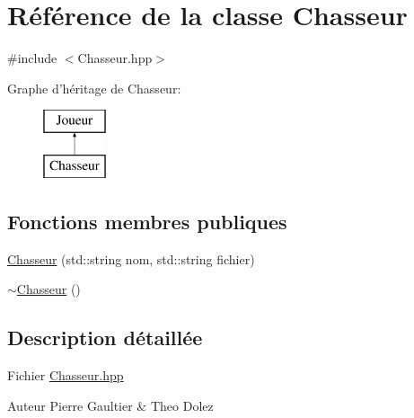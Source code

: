 \hypertarget{class_chasseur}{\section{Référence de la classe Chasseur}
\label{class_chasseur}
}


{\ttfamily \#include $<$Chasseur.\-hpp$>$}

Graphe d'héritage de Chasseur\-:\begin{figure}[H]
\begin{center}
\leavevmode
\includegraphics[height=2.000000cm]{class_chasseur}
\end{center}
\end{figure}
\subsection*{Fonctions membres publiques}
\begin{DoxyCompactItemize}
\item 
\hyperlink{class_chasseur_af4bca087f4380663c19cd91cf373cf50}{Chasseur} (std\-::string nom, std\-::string fichier)
\item 
\hyperlink{class_chasseur_a0a2966005d679a141a3da9beeba165fc}{$\sim$\-Chasseur} ()
\end{DoxyCompactItemize}


\subsection{Description détaillée}
Fichier \hyperlink{_chasseur_8hpp}{Chasseur.\-hpp} \begin{DoxyAuthor}{Auteur}
Pierre Gaultier \& Theo Dolez 
\end{DoxyAuthor}


